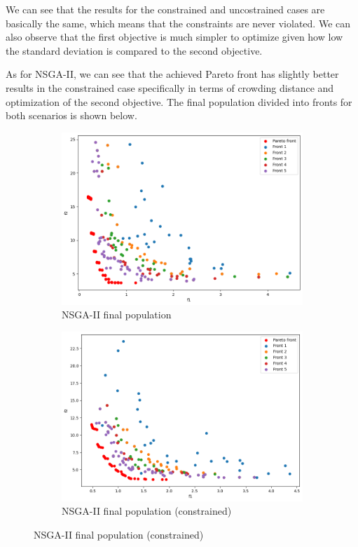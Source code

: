 We can see that the results for the constrained and uncostrained cases are basically the same, which means that the constraints are never violated. We can also observe that the first objective is much simpler to optimize given how low the standard deviation is compared to the second objective.

As for NSGA-II, we can see that the achieved Pareto front has slightly better results in the constrained case specifically in terms of crowding distance and optimization of the second objective. The final population divided into fronts for both scenarios is shown below.
\begin{figure}[H]
    \begin{subfigure}{0.5\textwidth}
        \includegraphics[width=\textwidth]{lab8/imgs/disk_nsga.png}
        \caption{NSGA-II final population}
    \end{subfigure}
    \begin{subfigure}{0.5\textwidth}
        \includegraphics[width=\textwidth]{lab8/imgs/disk_constr_nsga.png}
        \caption{NSGA-II final population (constrained)}
    \end{subfigure}
\end{figure}

